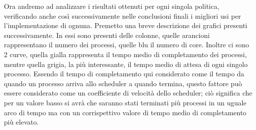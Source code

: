 \documentclass[Lau, oneside]{sapthesis}%
\begin{document}
Ora andremo ad analizzare i risultati ottenuti per ogni singola politica, verificando anche così successivamente nelle conclusioni finali i migliori usi per l'implementazione di ognuna.
Premetto una breve descrizione dei grafici presenti successivamente.
In essi sono presenti delle colonne, quelle arancioni rappresentano il numero dei processi, quelle blu il numero di core.
Inoltre ci sono 2 curve, quella gialla rappresenta il tempo medio di completamento dei processi, mentre quella grigia, la più interessante, il tempo medio di attesa di ogni singolo processo.
Essendo il tempo di completamento qui considerato come il tempo da quando un processo arriva allo scheduler a quando termina, questo fattore può essere considerato come un coefficiente di velocità dello scheduler; ciò significa che per un valore basso si avrà che saranno stati terminati più processi in un uguale arco di tempo ma con un corrispettivo valore di tempo medio di completamento più elevato.
\end{document}
